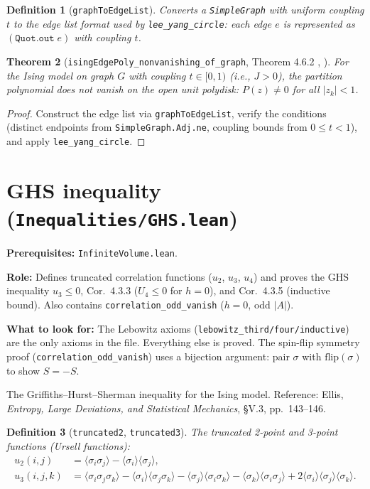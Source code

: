 \documentclass[a4paper,11pt]{article}
\newtheorem{theorem}{Theorem}
\newtheorem{definition}[theorem]{Definition}
\begin{document}
\begin{definition}[\texttt{graphToEdgeList}]
Converts a \texttt{SimpleGraph} with uniform coupling $t$ to the
edge list format used by \texttt{lee\_yang\_circle}:
each edge $e$ is represented as $(\texttt{Quot.out}\;e)$ with coupling $t$.
\end{definition}

\begin{theorem}[\texttt{isingEdgePoly\_nonvanishing\_of\_graph},
  Theorem 4.6.2 {\cite[pp.~64--70]{glimm-jaffe}},
  {\cite[Theorem~3.43, pp.~122--127]{friedli-velenik}}]
For the Ising model on graph $G$ with coupling $t \in [0,1)$
(i.e., $J > 0$), the partition polynomial does not vanish on the
open unit polydisk: $P(z) \ne 0$ for all $|z_k| < 1$.
\end{theorem}

\begin{proof}
Construct the edge list via \texttt{graphToEdgeList}, verify the
conditions (distinct endpoints from \texttt{SimpleGraph.Adj.ne},
coupling bounds from $0 \le t < 1$), and apply
\texttt{lee\_yang\_circle}.
\end{proof}

\section{GHS inequality (\texttt{Inequalities/GHS.lean})}

\par\noindent\textbf{Prerequisites:} \texttt{InfiniteVolume.lean}.

\textbf{Role:} Defines truncated correlation functions ($u_2$, $u_3$,
$u_4$) and proves the GHS inequality $u_3 \le 0$, Cor.~4.3.3
($U_4 \le 0$ for $h=0$), and Cor.~4.3.5 (inductive bound).
Also contains \texttt{correlation\_odd\_vanish} ($h=0$, odd $|A|$).

\textbf{What to look for:} The Lebowitz axioms
(\texttt{lebowitz\_third/four/inductive}) are the only axioms in the
file. Everything else is proved. The spin-flip symmetry proof
(\texttt{correlation\_odd\_vanish}) uses a bijection argument:
pair $\sigma$ with $\mathrm{flip}(\sigma)$ to show $S = -S$.

The Griffiths--Hurst--Sherman inequality for the Ising model.
Reference: Ellis, \emph{Entropy, Large Deviations, and Statistical
Mechanics}, \S V.3, pp.~143--146.

\begin{definition}[\texttt{truncated2}, \texttt{truncated3}]
The truncated 2-point and 3-point functions (Ursell functions):
\begin{align*}
  u_2(i,j) &= \langle\sigma_i\sigma_j\rangle - \langle\sigma_i\rangle\langle\sigma_j\rangle, \\
  u_3(i,j,k) &= \langle\sigma_i\sigma_j\sigma_k\rangle
    - \langle\sigma_i\rangle\langle\sigma_j\sigma_k\rangle
    - \langle\sigma_j\rangle\langle\sigma_i\sigma_k\rangle
    - \langle\sigma_k\rangle\langle\sigma_i\sigma_j\rangle
    + 2\langle\sigma_i\rangle\langle\sigma_j\rangle\langle\sigma_k\rangle.
\end{align*}
\end{definition}
\end{document}
